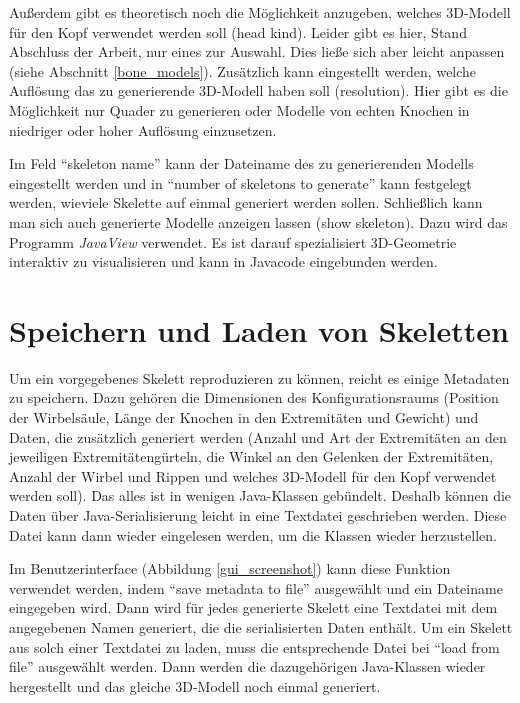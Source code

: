 Außerdem gibt es theoretisch noch die Möglichkeit anzugeben, welches 3D-Modell für den Kopf verwendet werden soll (head kind). Leider gibt es hier, Stand Abschluss der Arbeit, nur eines zur Auswahl. Dies ließe sich aber leicht anpassen (siehe Abschnitt \ref{bone_models}).
Zusätzlich kann eingestellt werden, welche Auflösung das zu generierende 3D-Modell haben soll (resolution). Hier gibt es die Möglichkeit nur Quader zu generieren oder Modelle von echten Knochen in niedriger oder hoher Auflösung einzusetzen.

Im Feld "`skeleton name"' kann der Dateiname des zu generierenden Modells eingestellt werden und in "`number of skeletons to generate"' kann festgelegt werden, wieviele Skelette auf einmal generiert werden sollen. Schließlich kann man sich auch generierte Modelle anzeigen lassen (show skeleton). Dazu wird das Programm \emph{JavaView} \cite{JavaView} verwendet. Es ist darauf spezialisiert 3D-Geometrie interaktiv zu visualisieren und kann in Javacode eingebunden werden.


\section{Speichern und Laden von Skeletten}
\label{load_skeletons}

Um ein vorgegebenes Skelett reproduzieren zu können, reicht es einige Metadaten zu speichern. Dazu gehören die Dimensionen des Konfigurationsraums (Position der Wirbelsäule, Länge der Knochen in den Extremitäten und Gewicht) und Daten, die zusätzlich generiert werden (Anzahl und Art der Extremitäten an den jeweiligen Extremitätengürteln, die Winkel an den Gelenken der Extremitäten, Anzahl der Wirbel und Rippen und welches 3D-Modell für den Kopf verwendet werden soll).
Das alles ist in wenigen Java-Klassen gebündelt. Deshalb können die Daten über Java-Serialisierung \cite{JavaSerialization} leicht in eine Textdatei geschrieben werden. Diese Datei kann dann wieder eingelesen werden, um die Klassen wieder herzustellen.

Im Benutzerinterface (Abbildung \ref{gui_screenshot}) kann diese Funktion verwendet werden, indem "`save metadata to file"' ausgewählt und ein Dateiname eingegeben wird. Dann wird für jedes generierte Skelett eine Textdatei mit dem angegebenen Namen generiert, die die serialisierten Daten enthält.
Um ein Skelett aus solch einer Textdatei zu laden, muss die entsprechende Datei bei "`load from file"' ausgewählt werden. Dann werden die dazugehörigen Java-Klassen wieder hergestellt und das gleiche 3D-Modell noch einmal generiert.

